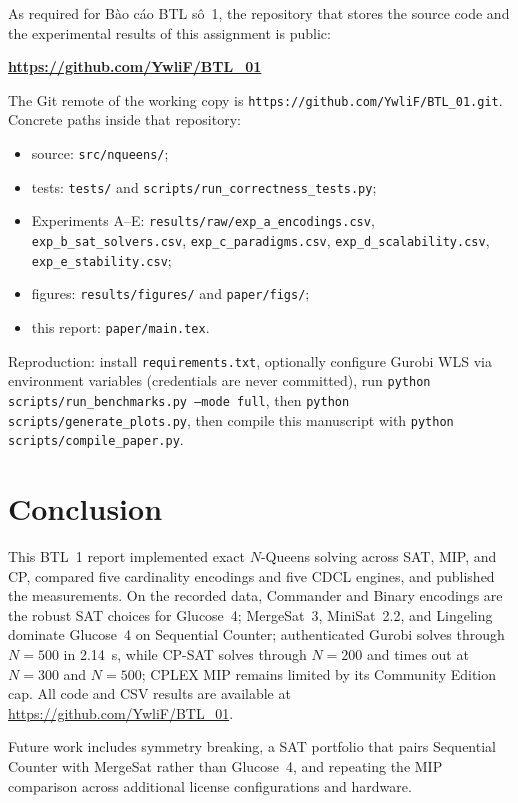 \documentclass[a4paper,fleqn]{cas-sc}
\begin{document}
As required for B{\`a}o c{\'a}o BTL s{\^o}~1, the repository that stores the source code and the experimental results of this assignment is public:

\begin{center}
\textbf{\url{https://github.com/YwliF/BTL_01}}
\end{center}

\noindent The Git remote of the working copy is \texttt{https://github.com/YwliF/BTL\_01.git}.
Concrete paths inside that repository:
\begin{itemize}
    \item source: \texttt{src/nqueens/};
    \item tests: \texttt{tests/} and \texttt{scripts/run\_correctness\_tests.py};
    \item Experiments A--E: \texttt{results/raw/exp\_a\_encodings.csv}, \texttt{exp\_b\_sat\_solvers.csv}, \texttt{exp\_c\_paradigms.csv}, \texttt{exp\_d\_scalability.csv}, \texttt{exp\_e\_stability.csv};
    \item figures: \texttt{results/figures/} and \texttt{paper/figs/};
    \item this report: \texttt{paper/main.tex}.
\end{itemize}
Reproduction: install \texttt{requirements.txt}, optionally configure Gurobi WLS via environment variables (credentials are never committed), run \texttt{python scripts/run\_benchmarks.py --mode full}, then \texttt{python scripts/generate\_plots.py}, then compile this manuscript with \texttt{python scripts/compile\_paper.py}.

\section{Conclusion}
\label{sec:conclusion}

This BTL~1 report implemented exact $N$-Queens solving across SAT, MIP, and CP, compared five cardinality encodings and five CDCL engines, and published the measurements.
On the recorded data, Commander and Binary encodings are the robust SAT choices for Glucose~4; MergeSat~3, MiniSat~2.2, and Lingeling dominate Glucose~4 on Sequential Counter; authenticated Gurobi solves through $N=500$ in 2.14~s, while CP-SAT solves through $N=200$ and times out at $N=300$ and $N=500$; CPLEX MIP remains limited by its Community Edition cap.
All code and CSV results are available at \url{https://github.com/YwliF/BTL_01}.

Future work includes symmetry breaking, a SAT portfolio that pairs Sequential Counter with MergeSat rather than Glucose~4, and repeating the MIP comparison across additional license configurations and hardware.

\printcredits



\end{document}

